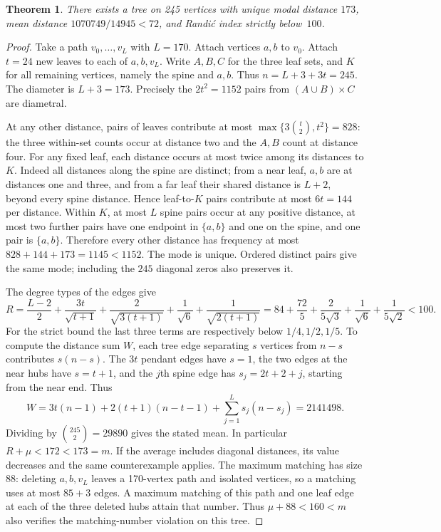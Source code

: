 \documentclass[11pt,a4paper]{article}
\newtheorem{theorem}{Theorem}[section]
\begin{document}
\begin{theorem}\label{thm:finite-mode}
There exists a tree on 245 vertices with unique modal distance $173$,
mean distance $1070749/14945<72$, and Randi\'c index strictly below~$100$.
\end{theorem}
\begin{proof}
Take a path $v_0,\ldots,v_L$ with $L=170$. Attach vertices $a,b$ to
$v_0$. Attach $t=24$ new leaves to each of $a,b,v_L$. Write $A,B,C$
for the three leaf sets, and $K$ for all remaining vertices, namely the
spine and $a,b$. Thus $n=L+3+3t=245$. The diameter is $L+3=173$.
Precisely the $2t^2=1152$ pairs from $(A\cup B)\times C$ are diametral.

At any other distance, pairs of leaves contribute at most
$\max\{3\binom{t}{2},t^2\}=828$: the three within-set counts occur at
distance two and the $A,B$ count at distance four. For any fixed leaf,
each distance occurs at most twice among its distances to $K$. Indeed
all distances along the spine are distinct; from a near leaf, $a,b$ are
at distances one and three, and from a far leaf their shared distance
is $L+2$, beyond every spine distance. Hence leaf-to-$K$ pairs contribute
at most $6t=144$ per distance. Within $K$, at most $L$ spine pairs occur
at any positive distance, at most two further pairs have one endpoint in
$\{a,b\}$ and one on the spine, and one pair is $\{a,b\}$. Therefore every
other distance has frequency at most $828+144+173=1145<1152$.
The mode is unique. Ordered distinct pairs give the same mode; including
the $245$ diagonal zeros also preserves it.

The degree types of the edges give
\[
 R=\frac{L-2}{2}+\frac{3t}{\sqrt{t+1}}+
   \frac{2}{\sqrt{3(t+1)}}+\frac1{\sqrt6}+
   \frac1{\sqrt{2(t+1)}}
 =84+\frac{72}{5}+\frac{2}{5\sqrt3}+\frac1{\sqrt6}+\frac1{5\sqrt2}<100.
\]
For the strict bound the last three terms are respectively below
$1/4,1/2,1/5$. To compute the distance sum $W$, each tree edge separating
$s$ vertices from $n-s$ contributes $s(n-s)$. The $3t$ pendant edges
have $s=1$, the two edges at the near hubs have $s=t+1$, and the
$j$th spine edge has $s_j=2t+2+j$, starting from the near end. Thus
\[
 W=3t(n-1)+2(t+1)(n-t-1)+\sum_{j=1}^{L}s_j(n-s_j)=2141498.
\]
Dividing by $\binom{245}2=29890$ gives the stated mean. In particular
$R+\mu<172<173=m$. If the average includes diagonal distances, its
value decreases and the same counterexample applies.
The maximum matching has size $88$: deleting $a,b,v_L$ leaves a
170-vertex path and isolated vertices, so a matching uses at most
$85+3$ edges. A maximum matching of this path and one leaf edge at each
of the three deleted hubs attain that number. Thus $\mu+88<160<m$
also verifies the matching-number violation on this tree.
\end{proof}
\end{document}
